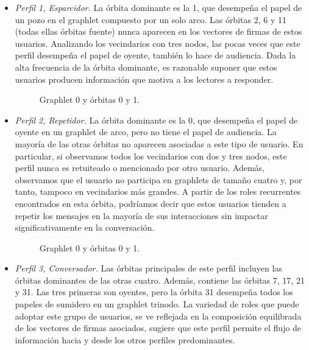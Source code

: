 \begin{itemize} 

\item \emph{Perfil 1, Esparcidor.} La órbita dominante es la 1, que desempeña el papel de un pozo en el graphlet compuesto por un solo arco. Las órbitas 2, 6 y 11 (todas ellas órbitas fuente) nunca aparecen en los vectores de firmas de estos usuarios. Analizando los vecindarios con tres nodos, las pocas veces que este perfil desempeña el papel de oyente, también lo hace de audiencia. Dada la alta frecuencia de la órbita dominante, es razonable suponer que estos usuarios producen información que motiva a los lectores a responder. \begin{figure}[htbp]
   \centering
   
    \caption{Graphlet 0 y órbitas 0 y 1.}
    \label{img:web-comp}
\end{figure}

\item \emph{Perfil 2, Repetidor.} La órbita dominante es la 0, que desempeña el papel de oyente en un graphlet de arco, pero no tiene el papel de audiencia. La mayoría de las otras órbitas no aparecen asociadas a este tipo de usuario. En particular, si observamos todos los vecindarios con dos y tres nodos, este perfil nunca es retuiteado o mencionado por otro usuario. Además, observamos que el usuario no participa en graphlets de tamaño cuatro y, por tanto, tampoco en vecindarios más grandes. A partir de los roles recurrentes encontrados en esta órbita, podríamos decir que estos usuarios tienden a repetir los mensajes en la mayoría de sus interacciones sin impactar significativamente en la conversación. \begin{figure}[htbp]
   \centering
   
    \caption{Graphlet 0 y órbitas 0 y 1.}
    \label{img:web-comp}
\end{figure}

\item \emph{Perfil 3, Conversador.} Las órbitas principales de este perfil incluyen las órbitas dominantes de las otras cuatro. Además, contiene las órbitas 7, 17, 21 y 31. Las tres primeras son oyentes, pero la órbita 31 desempeña todos los papeles de sumidero en un graphlet trinodo. La variedad de roles que puede adoptar este grupo de usuarios, se ve reflejada en la composición equilibrada de los vectores de firmas asociados, sugiere que este perfil permite el flujo de información hacia y desde los otros perfiles predominantes.
    

\end{itemize}
